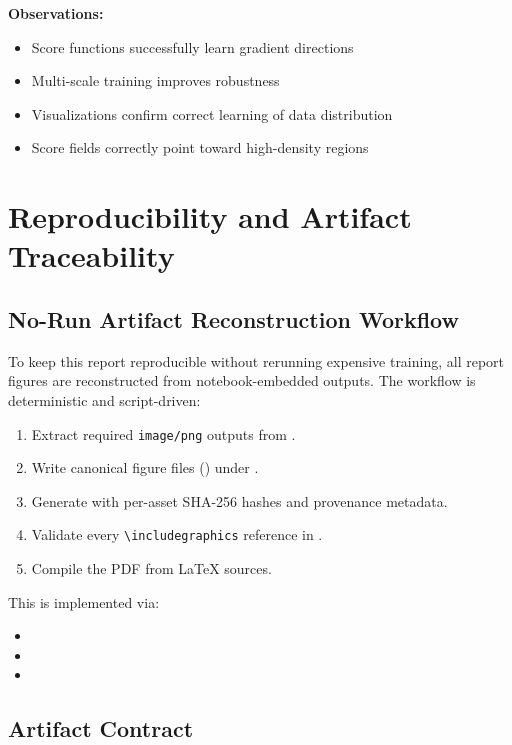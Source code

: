 \documentclass[journal]{IEEEtran}
\begin{document}
\textbf{Observations:}
\begin{itemize}
    \item Score functions successfully learn gradient directions
    \item Multi-scale training improves robustness
    \item Visualizations confirm correct learning of data distribution
    \item Score fields correctly point toward high-density regions
\end{itemize}

\section{Reproducibility and Artifact Traceability}

\subsection{No-Run Artifact Reconstruction Workflow}

To keep this report reproducible without rerunning expensive training, all report figures are reconstructed from notebook-embedded outputs. The workflow is deterministic and script-driven:

\begin{enumerate}
    \item Extract required \texttt{image/png} outputs from .
    \item Write canonical figure files () under .
    \item Generate  with per-asset SHA-256 hashes and provenance metadata.
    \item Validate every \texttt{\textbackslash includegraphics} reference in .
    \item Compile the PDF from LaTeX sources.
\end{enumerate}

This is implemented via:
\begin{itemize}
    \item {}
    \item {}
    \item {}
\end{itemize}

\subsection{Artifact Contract}
\end{document}
